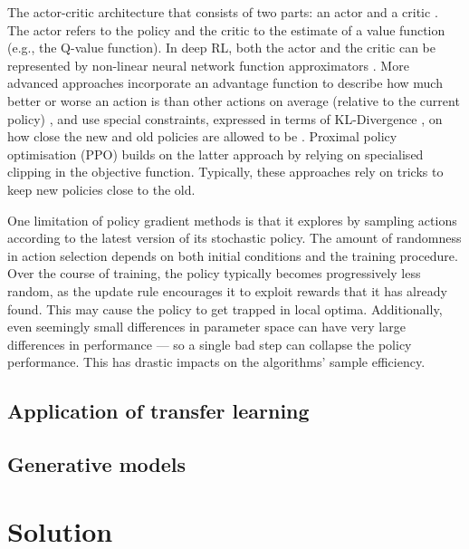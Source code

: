 \documentclass[12pt,a4paper]{article}
\begin{document}
The actor-critic architecture that consists of two parts: an actor and a critic \cite{Konda2000}. The actor refers to the policy and the critic to the estimate of a value function (e.g., the Q-value function). In deep RL, both the actor and the critic can be represented by non-linear neural network function approximators \cite{mnih2016asynchronous}. More advanced approaches incorporate an advantage function to describe how much better or worse an action is than other actions on average (relative to the current policy) \cite{schulman2018highdimensional}, and use special constraints, expressed in terms of KL-Divergence \cite{kullback1951information}, on how close the new and old policies are allowed to be \cite{DBLP:journals/corr/SchulmanLMJA15}. Proximal policy optimisation (PPO) \cite{DBLP:journals/corr/SchulmanWDRK17} builds on the latter approach by relying on specialised clipping in the objective function. Typically, these approaches rely on tricks to keep new policies close to the old. 

One limitation of policy gradient methods is that it explores by sampling actions according to the latest version of its stochastic policy. The amount of randomness in action selection depends on both initial conditions and the training procedure. Over the course of training, the policy typically becomes progressively less random, as the update rule encourages it to exploit rewards that it has already found. This may cause the policy to get trapped in local optima. Additionally, even seemingly small differences in parameter space can have very large differences in performance --- so a single bad step can collapse the policy performance. This has drastic impacts on the algorithms' sample efficiency.

\subsection{Application of transfer learning }

\subsection{Generative models}

\newpage
\section{Solution}
\end{document}
